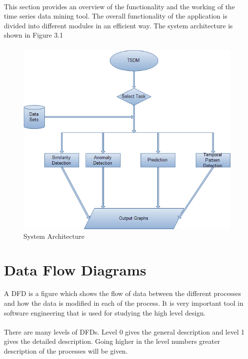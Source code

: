 \documentclass[12pt,a4paper]{report}
\begin{document}
\paragraph{}This section provides an overview of  the functionality and the working of the time series data mining tool. The overall functionality of the application is divided into different modules in an efficient way. The system architecture is shown in Figure 3.1
\paragraph{}

\begin{figure}[h!]
	\centering
		\includegraphics[scale=0.7]{system-architecture.png}
		\caption{ System Architecture}
\end{figure} 

\section{Data Flow Diagrams}
\paragraph{}A DFD is a figure which shows the flow of data between the different processes and how the data is modified in each of the process. It is very important tool in software engineering that is used for studying the high level design.\\
\paragraph{}There are many levels of DFDs. Level 0 gives the general description and level 1 gives the detailed description. Going higher in the level numbers greater description of the processes will be given.
\pagebreak
\end{document}
